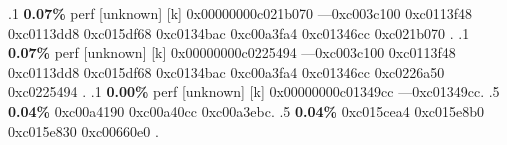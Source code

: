 \begin{profile}
{.1 \textbf{ 0.07\%} perf             [unknown]              [k] 0x00000000c021b070\newline {} ---0xc003c100\newline {} 0xc0113f48\newline {} 0xc0113dd8\newline {} 0xc015df68\newline {} 0xc0134bac\newline {} 0xc00a3fa4\newline {} 0xc01346cc\newline {} 0xc021b070\newline {} . 
.1 \textbf{ 0.07\%} perf             [unknown]              [k] 0x00000000c0225494\newline {} ---0xc003c100\newline {} 0xc0113f48\newline {} 0xc0113dd8\newline {} 0xc015df68\newline {} 0xc0134bac\newline {} 0xc00a3fa4\newline {} 0xc01346cc\newline {} 0xc0226a50\newline {} 0xc0225494\newline {} . 
.1 \textbf{ 0.00\%} perf             [unknown]              [k] 0x00000000c01349cc\newline {} ---0xc01349cc. 
.5 \textbf{0.04\%} 0xc00a4190\newline {} 0xc00a40cc\newline {} 0xc00a3ebc. 
.5 \textbf{0.04\%} 0xc015cea4\newline {} 0xc015e8b0\newline {} 0xc015e830\newline {} 0xc00660e0\newline {} . 
}
\end{profile}
